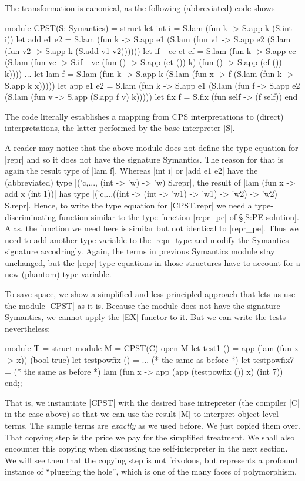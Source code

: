 \documentclass[preprint]{sigplanconf}
\begin{document}
The transformation is canonical, as the following (abbreviated) code
shows
\begin{code}
module CPST(S: Symantics) = struct
  let int i = S.lam (fun k -> S.app k (S.int i))
  let add e1 e2 = S.lam (fun k ->
    S.app e1 (S.lam (fun v1 ->
    S.app e2 (S.lam (fun v2 -> S.app k (S.add v1 v2))))))
  let if_ ec et ef = S.lam (fun k ->
    S.app ec (S.lam (fun vc ->
    S.if_ vc (fun () -> S.app (et ()) k) (fun () -> S.app (ef ())
    k))))
  ...
  let lam f = S.lam (fun k -> S.app k (S.lam (fun x ->
    f (S.lam (fun k -> S.app k x)))))
  let app e1 e2 = S.lam (fun k -> 
    S.app e1 (S.lam (fun f ->
    S.app e2 (S.lam (fun v -> S.app (S.app f v) k)))))
  let fix f  = S.fix (fun self -> (f self))
end
\end{code}
The code literally establishes a mapping from CPS interpretations to
(direct) interpretations, the latter performed by 
the base interpreter |S|.

A reader may notice that the above module does not define the type
equation for |repr| and so it does not have the signature Symantics.
The reason for that is again the result type of |lam f|. Whereas
|int i| or |add e1 e2| have the (abbreviated) 
type |('c,..., (int -> 'w) -> 'w) S.repr|,
the result of |lam (fun x -> add x (int 1))| has type
|('c,...((int -> (int -> 'w1) -> 'w1) -> 'w2) -> 'w2) S.repr|. 
Hence, to write the type equation for |CPST.repr| we need a 
type-discriminating
function similar to the type function |repr_pe| of
\S\ref{S:PE-solution}. Alas, the function we need here is
similar but not identical to |repr_pe|. Thus we need to add 
another type variable to the |repr| type and modify the Symantics
signature accodringly. Again, the terms in previous Symantics module
stay unchanged, but the |repr| type equations in those structures have to
account for a new (phantom) type variable.

To save space, we show a simplified and less principled approach that
lets us use the module |CPST| as it is. Because the module does not
have the signature Symantics, we cannot apply the |EX| functor to it.
But we can write the tests nevertheless:
\begin{code}
module T = struct
 module M = CPST(C)
 open M
 let test1 () = app (lam (fun x -> x)) (bool true)
 let testpowfix () = ... (* the same as before *)
 let testpowfix7 = (* the same as before *)
    lam (fun x -> app (app (testpowfix ()) x) (int 7))
end;;
\end{code}
That is, we instantiate |CPST| with the desired base intrepreter (the
compiler |C| in the case above) so that we can use the result |M| to
interpret object level terms. The sample terms are \emph{exactly}
as we used before. We just copied them over. That copying step is the
price we pay for the simplified treatment. We shall also encounter this
copying when discussing the self-interpreter in the next section. We
will see then that the copying step is not frivolous, but represents
a profound instance of 
``plugging the hole'', which is one of the many faces of polymorphism.
\end{document}
